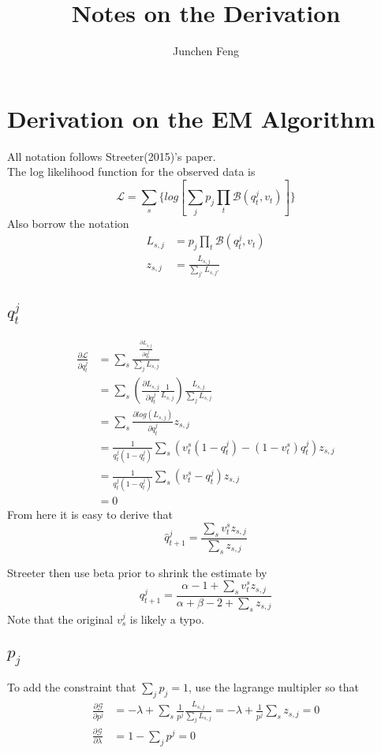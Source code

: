 \documentclass{article}
\title{Notes on the Derivation}
\author{Junchen Feng}
\begin{document}
\maketitle

\section{Derivation on the EM Algorithm}
All notation follows Streeter(2015)'s paper.\\
The log likelihood function for the observed data is \[
\mathcal{L} = \sum_{s}\{log[\sum_{j}p_j\prod_{t}\mathcal{B}(q_t^j, v_t)]\}
\]
Also borrow the notation
\begin{align*}
L_{s,j} &= p_j\prod_{t}\mathcal{B}(q_t^j, v_t) \\
z_{s,j} &= \frac{L_{s,j}}{\sum_{j'} L_{s,j'}}
\end{align*}


\subsection{$q_t^j$}
\begin{align*}
\frac{\partial \mathcal{L} }{\partial q_t^j} &=  \sum_{s} \frac{\frac{\partial L_{s,j}}{\partial q_t^j}}{\sum_{j}L_{s,j}}\\
&= \sum_{s} (\frac{\partial L_{s,j}}{\partial q_t^j}\frac{1}{L_{s,j}})\frac{L_{s,j}}{\sum_{j}L_{s,j}}\\
&= \sum_{s} \frac{\partial log(L_{s,j})}{\partial q_t^j} z_{s,j}\\
&= \frac{1}{q_t^j(1-q_t^j)}\sum_{s} (v_t^s(1-q_t^j)-(1-v_t^s)q_t^j)z_{s,j}\\
&= \frac{1}{q_t^j(1-q_t^j)}\sum_{s} (v_t^s-q_t^j)z_{s,j}\\
&=0
\end{align*}
From here it is easy to derive that
\[
\hat{q}_{t+1}^j = \frac{\sum_{s}v_t^sz_{s,j}}{\sum_{s}z_{s,j}}
\]

Streeter then use beta prior to shrink the estimate by
\[
q_{t+1}^j = \frac{\alpha-1+\sum_{s}v_t^sz_{s,j}}{\alpha+\beta-2+\sum_{s}z_{s,j}}
\]
Note that the original $v_s^j$ is likely a typo.

\subsection{$p_j$}
To add the constraint that $\sum_{j}p_j = 1$, use the lagrange multipler so that
\begin{align*}
\frac{\partial \mathcal{G} }{\partial p^j} &=  -\lambda + \sum_{s} \frac{1}{p^j}\frac{L_{s,j}}{\sum_{j}L_{s,j}} = -\lambda + \frac{1}{p^j} \sum_{s} z_{s,j} = 0\\
\frac{\partial \mathcal{G} }{\partial \lambda} &= 1 - \sum_{j}p^j = 0
\end{align*}
\end{document}
